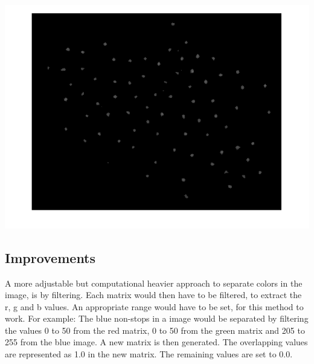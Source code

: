 \centerline{\includegraphics[scale=0.3]{dots.png}}
\subsection{Improvements}
A more adjustable but computational heavier approach to separate colors in the image, is by filtering. Each matrix would then have to be filtered, to extract the r, g and b values. An appropriate range would have to be set, for this method to work. For example: The blue non-stops in a image would be separated by filtering the values 0 to 50 from the red matrix, 0 to 50 from the green matrix and 205 to 255 from the blue image. A new matrix is then generated. The overlapping values are represented as 1.0 in the new matrix. The remaining values are set to 0.0. \\

